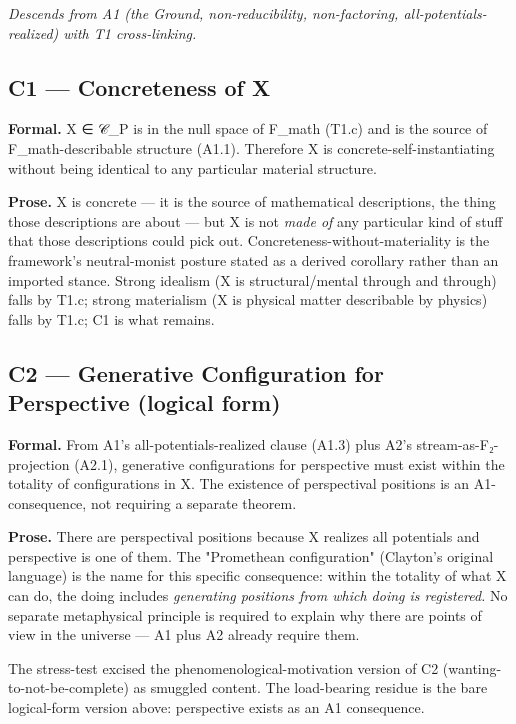 \documentclass[11pt, openany]{book}
\begin{document}
\textit{Descends from A1 (the Ground, non-reducibility, non-factoring, all-potentials-realized) with T1 cross-linking.}

\subsection{C1 --- Concreteness of X}

\textbf{Formal.} X ∈ 𝒞\_\allowbreak{}P is in the null space of F\_\allowbreak{}math (T1.c) and is the source of F\_\allowbreak{}math-describable structure (A1.1). Therefore X is concrete-self-instantiating without being identical to any particular material structure.

\textbf{Prose.} X is concrete --- it is the source of mathematical descriptions, the thing those descriptions are about --- but X is not \textit{made of} any particular kind of stuff that those descriptions could pick out. Concreteness-without-materiality is the framework's neutral-monist posture stated as a derived corollary rather than an imported stance. Strong idealism (X is structural/mental through and through) falls by T1.c; strong materialism (X is physical matter describable by physics) falls by T1.c; C1 is what remains.

\subsection{C2 --- Generative Configuration for Perspective (logical form)}

\textbf{Formal.} From A1's all-potentials-realized clause (A1.3) plus A2's stream-as-F₂-projection (A2.1), generative configurations for perspective must exist within the totality of configurations in X. The existence of perspectival positions is an A1-consequence, not requiring a separate theorem.

\textbf{Prose.} There are perspectival positions because X realizes all potentials and perspective is one of them. The "Promethean configuration" (Clayton's original language) is the name for this specific consequence: within the totality of what X can do, the doing includes \textit{generating positions from which doing is registered.} No separate metaphysical principle is required to explain why there are points of view in the universe --- A1 plus A2 already require them.

The stress-test excised the phenomenological-motivation version of C2 (wanting-to-not-be-complete) as smuggled content. The load-bearing residue is the bare logical-form version above: perspective exists as an A1 consequence.
\end{document}
